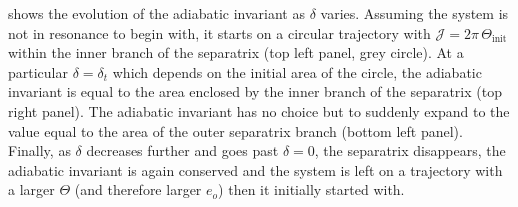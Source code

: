 \documentclass[twoside,openright,titlepage,numbers=noenddot,headinclude,%
                footinclude=true,cleardoublepage=empty,abstractoff, 
                BCOR=5mm,paper=a4,fontsize=11pt,%
                american,%
                ]{scrreprt}%
\begin{document}
 shows the evolution of the adiabatic 
invariant as $\delta$ varies. Assuming the system is not in resonance
to begin with, it starts on a circular trajectory with $\mathcal{J}
=2\pi\,\Theta_\text{init}$ within the inner branch of the separatrix
(top left panel, grey circle). At a particular $\delta=\delta_t$
which depends on the initial area of the circle, the adiabatic 
invariant is equal to the area enclosed by the inner branch of the
separatrix (top right panel). The adiabatic invariant has no choice
but to suddenly expand to the value equal to the area of the
outer separatrix branch (bottom left panel). Finally, as $\delta$
decreases further and goes past $\delta=0$, the separatrix
disappears, the adiabatic invariant is again conserved and the 
system is left on a trajectory with a larger $\Theta$ (and
therefore larger $e_o$) then it initially started with.
\end{document}

